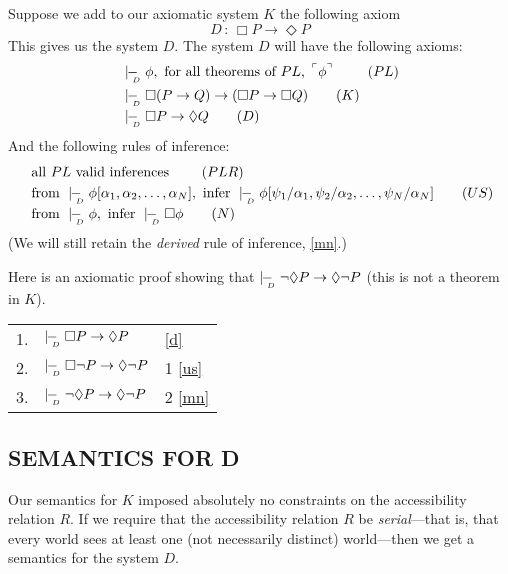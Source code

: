 \documentclass[landscape, two column, full page,reqno]{article}
\newcommand{\p}{\item}
\newcommand{\e}{\emph}
\newcommand{\tnot}{\neg}
\newcommand{\fns}[1]{{\footnotesize #1}}
\newcommand{\qq}[1]{ ~\!^\ulcorner #1  ^\urcorner~\!}
\newcommand{\dproves}{\mid\hspace{-3.9pt}-_{\!\!\!\raisebox{-3pt}{\text{\tiny$D$}}}\hspace{3pt}}
\newcommand{\D}{\Diamond}
\newcommand{\B}{\Box}
\newcommand{\hs}{\hspace{2pt}}
\begin{document}
\p Suppose we add to our axiomatic system  $K$ the following axiom
	\[
	D \hs:\hs \B P \to \D P 
	\]
This gives us the system ${D}$.  The system $D$ will have the following axioms:
		\begin{align}
		& \dproves \phi, \text{ for all theorems of $PL$, $\qq{\phi}$ }			\tag{$PL$}\label{plt}	\\
		& \dproves\B( P \to Q) \to (\B P \to \B Q)	\tag{$K$}\label{k}	\\
		& \dproves \B P \to \D Q				\tag{$D$} \label{d}
		 \end{align}
And the following rules of inference:
		\begin{align}
		&\text{ all $PL$ valid inferences } \tag{$PLR$}\label{plr}	\\
		&\text{ from } \dproves \phi[\alpha_1, \alpha_2, \dots, \alpha_N] , \text{ infer } \dproves \phi [\psi_1/\alpha_1, \psi_2/\alpha_2, \dots, \psi_N/\alpha_N]	\tag{$US$}\label{us}\\
		& \mbox{ from } \dproves \phi, \mbox{ infer } \dproves \B \phi \tag{$N$}\label{n}
		\end{align}
(We will still retain the \e{derived} rule of inference, \ref{mn}.)
\p Here is an axiomatic proof showing that $\dproves  \neg \D P \to \D \neg P$  (this is not a theorem in $K$).  
\begin{center}
\begin{tabularx}{300pt}{l X l}
1.& $\dproves \B P \to \D P$			&	\eqref{d}	\\
2.& $\dproves \B \neg  P \to \D \neg  P$	&1  \eqref{us}	\\
3. & $\dproves \neg \D P \to \D \neg P$	& 2 \eqref{mn}
\end{tabularx}
\end{center}

\subsection{S\fns{EMANTICS} F\fns{OR} D}
Our semantics for $K$ imposed absolutely no constraints on the accessibility relation $R$.    If we require that the accessibility relation $R$ be \e{serial}---that is, that every world sees at least one (not necessarily distinct) world---then we get a semantics for the system $D$.
\end{document}
